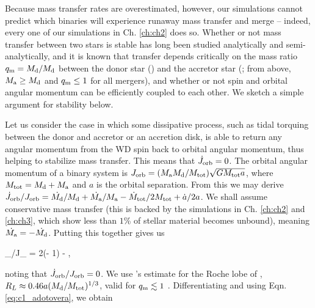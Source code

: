 
Because mass transfer rates are overestimated, however, our simulations cannot predict which binaries will experience runaway mass transfer and merge -- indeed, every one of our simulations in Ch. \ref{ch:ch2} does so.  Whether or not mass transfer between two stars is stable has long been studied analytically and semi-analytically, and it is known that transfer depends critically on the mass ratio $\qm = \Md/\Md$ between the donor star (\Md) and the accretor star (\Ma; from above, $\Ma \geq \Md$ and $\qm \leq 1$ for all mergers), and whether or not spin and orbital angular momentum can be efficiently coupled to each other.  We sketch a simple argument for stability below.

Let us consider the case in which some dissipative process, such as tidal torquing between the donor and accretor or an accretion disk, is able to return any angular momentum from the WD spin back to orbital angular momentum, thus helping to stabilize mass transfer.  This means that $\dot{J}_\mathrm{orb} = 0$.  The orbital angular momentum of a binary system is $J_\mrm{orb} = (\Ma\Md/\Mtot)\sqrt{G\Mtot a}$, where $\Mtot = \Md + \Ma$ and $a$ is the orbital separation.  From this we may derive $\dot{J}_\mrm{orb}/J_\mrm{orb} = \dot{\Md}/\Md + \dot{\Ma}/\Ma - \dot{M}_\mrm{tot}/2\Mtot + \dot{a}/2a$.  We shall assume conservative mass transfer (this is backed by the simulations in Ch. \ref{ch:ch2} and \ref{ch:ch3}, which show less than $1$\% of stellar material becomes unbound), meaning $\dot{\Ma} = -\dot{\Md}$.  Putting this together gives us

\eqbegin
{}_/J_ = 2(\qm- 1)\frac{\dot{\Md}}{\Md} - ,
\label{eq:c1_adotovera}
\eqend

\noindent noting that $\dot{J}_\mathrm{orb}/J_\mathrm{orb} = 0$.  We use \cite{pacz71}'s estimate for the Roche lobe of \Md, $R_L \approx 0.46a(\Md/\Mtot)^{1/3}$, valid for $\qm \lesssim 1$ \citep{eggl83}.  Differentiating and using Eqn. \ref{eq:c1_adotovera}, we obtain

